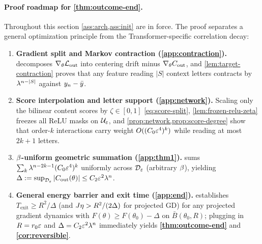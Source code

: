 \paragraph{Proof roadmap for \cref{thm:outcome-end}.}
Throughout this section \cref{ass:arch,ass:init} are in force. The proof separates a general optimization principle from the Transformer-specific correlation decay:
\begin{enumerate}[leftmargin=*,nosep,topsep=3pt]
  \item \textbf{Gradient split and Markov contraction (\cref{app:contraction}).}  decomposes $\nabla_\theta\mathcal L_{\mathrm{out}}$ into centering drift minus $\nabla_\theta C_{\mathrm{out}}$, and \cref{lem:target-contraction} proves that any feature reading $|S|$ context letters contracts by $\lambda^{n-|S|}$ against $y_n - \bar y$.
  \item \textbf{Score interpolation and letter support (\cref{app:network}).} Scaling only the bilinear content scores by $\zeta \in [0,1]$ \cref{eq:score-split}, \cref{lem:frozen-relu-zeta} freezes all ReLU masks on $\mathcal U_{\varepsilon}$, and \cref{prop:network,prop:score-degree} show that order-$k$ interactions carry weight $O((C_0\varepsilon^4)^k)$ while reading at most $2k + 1$ letters.
  \item \textbf{$\beta$-uniform geometric summation (\cref{app:thm1}).}  sums $\sum_k \lambda^{n-2k-1}(C_0\varepsilon^4)^k$ uniformly across $\mathcal D_{\varepsilon}$ (arbitrary $\beta$), yielding $\Delta := \sup_{\mathcal D_{\varepsilon}}|C_{\mathrm{out}}(\theta)| \le C_2\varepsilon^2\lambda^n$.
  \item \textbf{General energy barrier and exit time (\cref{app:end}).}  establishes $T_{\mathrm{exit}} \ge R^2/\Delta$ (and $J\eta > R^2/(2\Delta)$ for projected GD) for any projected gradient dynamics with $F(\theta) \ge F(\theta_0) - \Delta$ on $\bar B(\theta_0, R)$; plugging in $R = r_0\varepsilon$ and $\Delta = C_2\varepsilon^2\lambda^n$ immediately yields \textbf{\cref{thm:outcome-end}} and \textbf{\cref{cor:reversible}}.
\end{enumerate}

